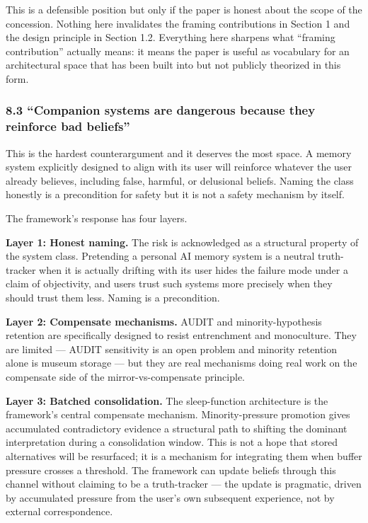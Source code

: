\documentclass[
  11pt,
]{article}
\begin{document}
This is a defensible position but only if the paper is honest about the
scope of the concession. Nothing here invalidates the framing
contributions in Section 1 and the design principle in Section 1.2.
Everything here sharpens what ``framing contribution'' actually means:
it means the paper is useful as vocabulary for an architectural space
that has been built into but not publicly theorized in this form.

\hypertarget{companion-systems-are-dangerous-because-they-reinforce-bad-beliefs}{%
\subsubsection{8.3 ``Companion systems are dangerous because they
reinforce bad
beliefs''}\label{companion-systems-are-dangerous-because-they-reinforce-bad-beliefs}}

This is the hardest counterargument and it deserves the most space. A
memory system explicitly designed to align with its user will reinforce
whatever the user already believes, including false, harmful, or
delusional beliefs. Naming the class honestly is a precondition for
safety but it is not a safety mechanism by itself.

The framework's response has four layers.

\textbf{Layer 1: Honest naming.} The risk is acknowledged as a
structural property of the system class. Pretending a personal AI memory
system is a neutral truth-tracker when it is actually drifting with its
user hides the failure mode under a claim of objectivity, and users
trust such systems more precisely when they should trust them less.
Naming is a precondition.

\textbf{Layer 2: Compensate mechanisms.} AUDIT and minority-hypothesis
retention are specifically designed to resist entrenchment and
monoculture. They are limited --- AUDIT sensitivity is an open problem
and minority retention alone is museum storage --- but they are real
mechanisms doing real work on the compensate side of the
mirror-vs-compensate principle.

\textbf{Layer 3: Batched consolidation.} The sleep-function architecture
is the framework's central compensate mechanism. Minority-pressure
promotion gives accumulated contradictory evidence a structural path to
shifting the dominant interpretation during a consolidation window. This
is not a hope that stored alternatives will be resurfaced; it is a
mechanism for integrating them when buffer pressure crosses a threshold.
The framework can update beliefs through this channel without claiming
to be a truth-tracker --- the update is pragmatic, driven by accumulated
pressure from the user's own subsequent experience, not by external
correspondence.
\end{document}
